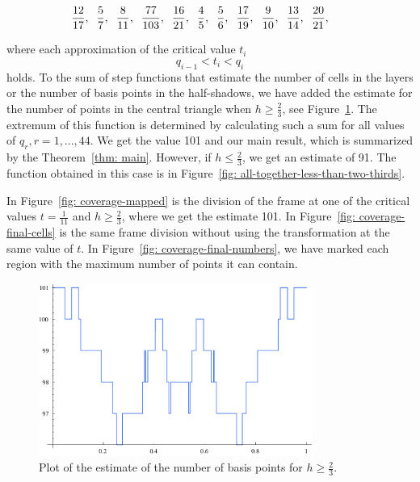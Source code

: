 \begin{align*}
&\frac{ 12}{17}, \text{\hspace{0.2cm}} \frac{5}{7}, \text{\hspace{0.2cm}} \frac{ 8}{11}, \text{\hspace{0.2cm}} \frac{ 77}{103}, \text{\hspace{0.2cm}} \frac{ 16}{21}, \text{\hspace{0.2cm}} \frac{ 4}{5}, \text{\hspace{0.2cm}} \frac{ 5}{6}, \text{\hspace{0.2cm}} \frac{ 17}{19}, \text{\hspace{0.2cm}} \frac{ 9}{10}, \text{\hspace{0.2cm}} \frac{ 13}{14}, \text{\hspace{0.2cm}} \frac{ 20}{21}, \text{\hspace{0.2cm}}
\end{align*}

where each approximation of the critical value $t_{i}$
$$
q_{i-1} < t_{i} < q_{i}
$$
holds. To the sum of step functions that estimate the number of cells in the layers or the number of basis points in the half-shadows, we have added the estimate for the number of points in the central triangle when $h \geq \frac{2}{3}$, see Figure~\ref{fig: all-together-more-than-two-thirds}. The extremum of this function is determined by calculating such a sum for all values of $q_{r}, r = 1,..., 44$. We get the value 101 and our main result, which is summarized by the Theorem~\ref{thm: main}. However, if $h \leq \frac{2}{3}$, we get an estimate of 91. The function obtained in this case is in Figure~\ref{fig: all-together-less-than-two-thirds}.

In Figure~\ref{fig: coverage-mapped} is the division of the frame at one of the critical values $t = \frac{1}{11}$ and $h \geq \frac{2}{3}$, where we get the estimate 101. In Figure~\ref{fig: coverage-final-cells} is the same frame division without using the transformation at the same value of $t$. In Figure~\ref{fig: coverage-final-numbers}, we have marked each region with the maximum number of points it can contain.

\begin{figure}
\centering
\includegraphics[width=0.8\textwidth]{./figures/all-together-more-than-two-thirds.pdf}
\caption{Plot of the estimate of the number of basis points for $h \geq \frac{2}{3}$.}
\label{fig: all-together-more-than-two-thirds}
\end{figure}

